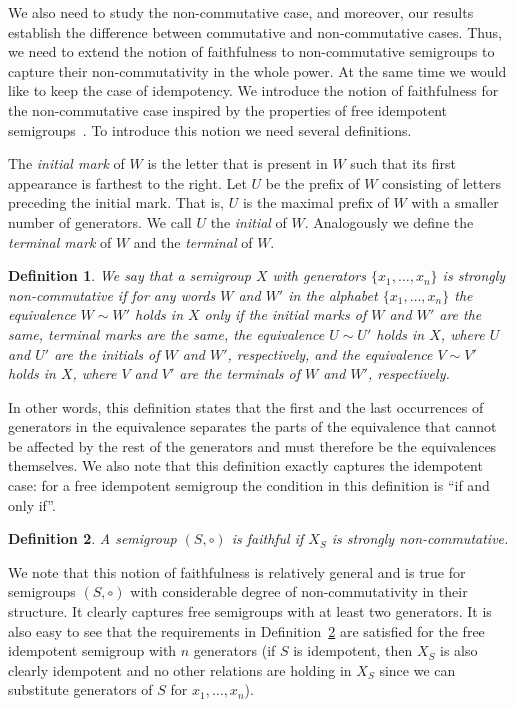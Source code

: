 \documentclass[11pt,letterpaper]{article}
\newtheorem{definition}{Definition}
\begin{document}
We also need to study the non-commutative case, and moreover, our results
establish the difference between commutative and non-commutative cases. Thus,
we need to extend the notion of faithfulness to non-commutative semigroups to
capture their non-commutativity in the whole power. At the same time we would
like to keep the case of idempotency. We introduce the notion of faithfulness
for the non-commutative case inspired by the properties of free idempotent
semigroups~\cite{GreenR52}. To introduce this notion we need several
definitions.

The \emph{initial mark} of $W$ is the letter that is present in $W$ such that
its first appearance is farthest to the right. Let $U$ be the prefix of $W$
consisting of letters preceding the initial mark. That is, $U$ is the maximal
prefix of $W$ with a smaller number of generators. We call $U$ the
\emph{initial} of $W$. Analogously we define the \emph{terminal mark} of $W$ and
the \emph{terminal} of $W$.

\begin{definition}\label{def:strong_non_commutativity}
We say that a semigroup $X$ with generators $\{x_1,\ldots, x_n\}$ is
\emph{strongly non-commutative} if for any words $W$ and $W'$ in the
alphabet $\{x_1,\ldots, x_n\}$ the equivalence $W\sim W'$ holds in $X$ only if
the initial marks of $W$ and $W'$ are the same, terminal marks are the same,
the equivalence $U \sim U'$ holds in $X$, where $U$ and $U'$ are the initials of
$W$ and $W'$, respectively, and the equivalence $V \sim V'$ holds in $X$, where
$V$ and $V'$ are the terminals of $W$ and $W'$, respectively.
\end{definition}

In other words, this definition states that the first and the last occurrences
of generators in the equivalence separates the parts of the equivalence that
cannot be affected by the rest of the generators and must therefore be the
equivalences themselves. We also note that this definition exactly captures the
idempotent case: for a free idempotent semigroup the condition in this
definition is ``if and only if''\cite{GreenR52}.

\begin{definition} \label{def:faithful}
A semigroup $(S, \circ)$ is \emph{faithful} if $X_S$ is strongly non-commutative.
\end{definition}

We note that this notion of faithfulness is relatively general and is true for
semigroups $(S,\circ)$ with considerable degree of non-commutativity in their
structure. It clearly captures free semigroups with at least two generators. It is also easy to see that the
requirements in Definition~\ref{def:faithful} are satisfied for the free
idempotent semigroup with $n$ generators (if $S$ is idempotent, then $X_S$ is also
clearly idempotent and no other relations are holding in $X_S$ since we can
substitute generators of $S$ for $x_1, \ldots, x_n$).
\end{document}
